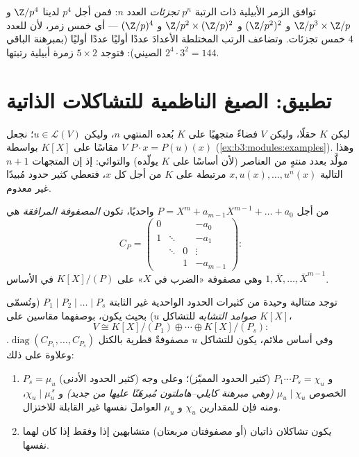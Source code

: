 \begin{example}\label{ex:b3:modules:abelian}
توافق الزمر الأبيلية ذات الرتبة $p^n$ \emph{تجزئات} العدد $n$:
فمن أجل $p^4$ لدينا $\Z/p^4$ و $\Z/p^3\times\Z/p$ و $(\Z/p^2)^2$ و $\Z/p^2 \times (\Z/p)^2$
و $(\Z/p)^4$ --- أي خمس زمر، لأن للعدد $4$ خمس تجزئات. وتضاعف
الرتب المختلطة الأعدادَ عددًا أوليًا عددًا أوليًا (بمبرهنة الباقي
الصيني): فتوجد $5 \times 2$ زمرة أبيلية رتبتها $2^4 \cdot 3^2 = 144$.
\end{example}

\section{تطبيق: الصيغ الناظمية للتشاكلات الذاتية}

ليكن $K$ حقلًا، وليكن $V$ فضاءً متجهيًا على $K$ بُعده المنتهي $n$،
وليكن $u \in \mathcal L(V)$؛ نجعل $V$ مقاسًا على $K[X]$ بواسطة $P
\cdot x = P(u)(x)$
(\cref{ex:b3:modules:examples}). وهذا  مولَّد بعدد منتهٍ من العناصر (لأن أساسًا
على $K$ يولّده) والتوائي: إذ إن المتجهات $n+1$ التالية $x, u(x), \dots, u^n(x)$
مرتبطة على $K$ من أجل كل $x$، فتعطي كثير حدود مُبيدًا غير معدوم.

\begin{definition}\label{def:b3:modules:companion}
من أجل $P = X^m + a_{m-1}X^{m-1} + \dots + a_0$ واحديًا، تكون \emph{المصفوفة
المرافقة} هي
\[
C_P = \begin{pmatrix}
0 & & & -a_0\\
1 & \ddots & & -a_1\\
& \ddots & 0 & \vdots\\
& & 1 & -a_{m-1}
\end{pmatrix} :
\]
وهي مصفوفة «الضرب في $X$» على $K[X]/(P)$ في الأساس $1, \bar X, \dots, \bar X^{m-1}$.
\end{definition}

\begin{theorem}
\label{thm:b3:modules:frobenius}
توجد متتالية وحيدة من كثيرات الحدود الواحدية غير الثابتة $P_1
\mid P_2 \mid \dots \mid P_s$
(وتُسمّى \emph{صوامد التشابه} للتشاكل $u$)
بحيث يكون، بوصفهما مقاسين على $K[X]$،
\[
V \cong K[X]/(P_1) \oplus \cdots \oplus K[X]/(P_s):
\]
وفي أساس ملائم، يكون للتشاكل $u$ مصفوفةٌ قطرية بالكتل $\operatorname{diag}(C_{P_1}, \dots, C_{P_s})$. وعلاوة
على ذلك:
\begin{enumerate}
  \item $P_s = \mu_u$ (كثير الحدود الأدنى) و $P_1\cdots P_s =
        \chi_u$ (كثير
        الحدود المميّز)؛ وعلى وجه الخصوص $\mu_u
        \mid \chi_u$ \emph{(وهي
        مبرهنة كايلي--هاملتون مُبرهَنًا عليها من جديد)} و $\chi_u \mid \mu_u^{\,s}$،
        ومنه فإن للمقدارين $\chi_u$ و $\mu_u$ العواملَ نفسها غير القابلة
        للاختزال.
  \item يكون تشاكلان ذاتيان (أو مصفوفتان مربعتان) متشابهين إذا
        وفقط إذا كان لهما  نفسها.
\end{enumerate}
\end{theorem}

